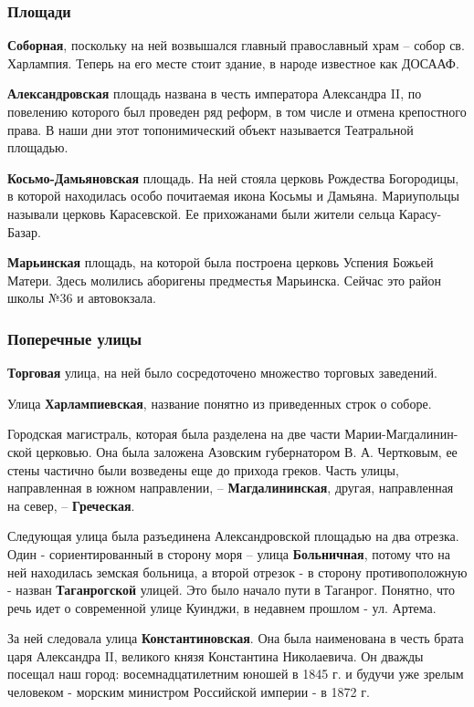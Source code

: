 \subsubsection{Площади}

\textbf{Соборная}, поскольку  на ней возвышался главный православный  храм – собор св.
Харлампия. Теперь на его месте стоит здание, в народе известное как ДОСААФ.

\textbf{Александровская} площадь названа в честь императора Александра II, по повелению
которого был проведен ряд реформ, в том числе и отмена  крепостного права.  В
наши  дни  этот топонимический объект называется Театральной площадью.

\textbf{Косьмо-Дамьяновская} площадь. На ней стояла церковь Рождества Богородицы, в
которой находилась  особо почитаемая икона Косьмы и Дамьяна. Мариупольцы
называли церковь Карасевской. Ее прихожанами были жители сельца Карасу-Базар.

\textbf{Марьинская} площадь, на которой была построена церковь Успения Божьей Матери.
Здесь молились аборигены предместья Марьинска. Сейчас это район школы №36 и
автовокзала.

\subsubsection{Поперечные улицы}

\textbf{Торговая} улица, на ней было сосредоточено множество торговых заведений.

Улица \textbf{Харлампиевская}, название понятно из приведенных строк о соборе. 

Городская магистраль, которая была разделена на две части Марии-Магдалинин\hyp{}ской
церковью. Она была заложена Азовским губернатором В. А. Чертковым, ее стены
частично были возведены еще до прихода греков. Часть улицы, направленная в
южном направлении, – \textbf{Магдалининская}, другая, направленная  на север, –
\textbf{Греческая}.

Следующая улица была  разъединена Александровской площадью на два отрезка. Один
- сориентированный в сторону моря – улица \textbf{Больничная}, потому что на ней
находилась земская больница, а второй отрезок - в сторону противоположную -
назван  \textbf{Таганрогской} улицей. Это было начало пути в Таганрог. Понятно, что речь
идет о современной улице Куинджи, в недавнем прошлом - ул. Артема.

За ней следовала улица \textbf{Константиновская}. Она была наименована в честь брата
царя Александра ΙΙ,  великого князя Константина Николаевича. Он дважды посещал
наш город: восемнадцатилетним юношей в 1845 г.  и будучи уже  зрелым человеком
- морским министром Российской империи - в 1872 г. 

